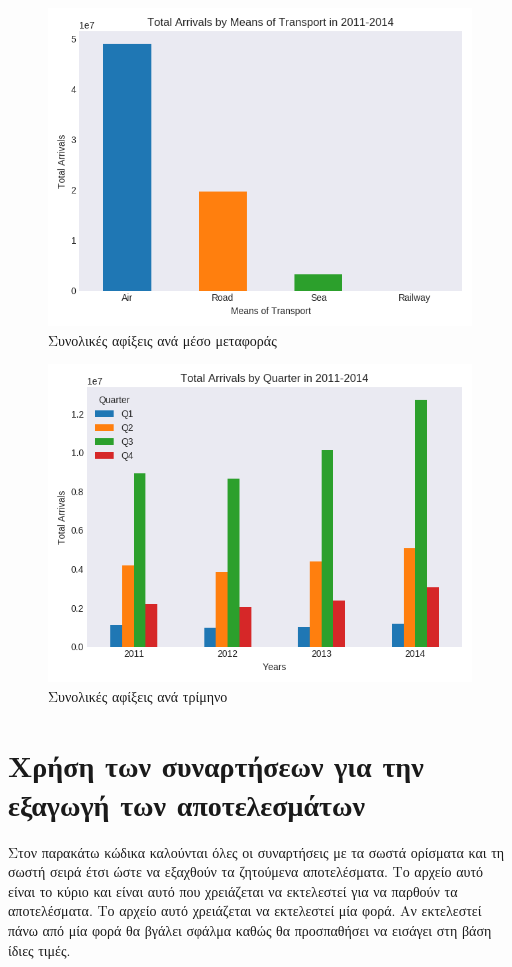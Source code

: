 \documentclass[a4paper]{article}
\begin{document}
\begin{figure}[H]
\centering
\includegraphics[scale=0.7]{total_arrivals_by_means_of_transport}
\caption{Συνολικές αφίξεις ανά μέσο μεταφοράς}
\label{fig:total_arrivals_by_means_of_transport}
\end{figure}

\begin{figure}[H]
\centering
\includegraphics[scale=0.7]{total_arrivals_by_quarter}
\caption{Συνολικές αφίξεις ανά τρίμηνο}
\label{fig:total_arrivals_by_quarter}
\end{figure}

\section{Χρήση των συναρτήσεων για την εξαγωγή των αποτελεσμάτων}
Στον παρακάτω κώδικα καλούνται όλες οι συναρτήσεις με τα σωστά ορίσματα και τη σωστή σειρά έτσι ώστε να εξαχθούν τα ζητούμενα αποτελέσματα. Το αρχείο αυτό είναι το κύριο και είναι αυτό που χρειάζεται να εκτελεστεί για να παρθούν τα αποτελέσματα. Το αρχείο αυτό χρειάζεται να εκτελεστεί μία φορά. Αν εκτελεστεί πάνω από μία φορά θα βγάλει σφάλμα καθώς θα προσπαθήσει να εισάγει στη βάση ίδιες τιμές.
\end{document}
